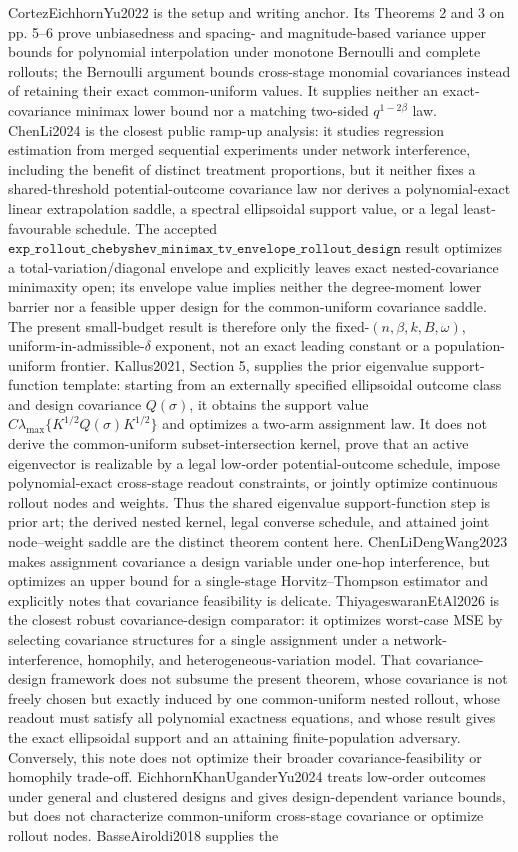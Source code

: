 \documentclass{article}
\begin{document}
CortezEichhornYu2022 is the setup and writing anchor. Its Theorems 2 and 3 on pp. 5--6 prove unbiasedness and spacing- and magnitude-based variance upper bounds for polynomial interpolation under monotone Bernoulli and complete rollouts; the Bernoulli argument bounds cross-stage monomial covariances instead of retaining their exact common-uniform values. It supplies neither an exact-covariance minimax lower bound nor a matching two-sided \(q^{1-2\beta}\) law. ChenLi2024 is the closest public ramp-up analysis: it studies regression estimation from merged sequential experiments under network interference, including the benefit of distinct treatment proportions, but it neither fixes a shared-threshold potential-outcome covariance law nor derives a polynomial-exact linear extrapolation saddle, a spectral ellipsoidal support value, or a legal least-favourable schedule. The accepted \(\texttt{exp\_rollout\_chebyshev\_minimax\_tv\_envelope\_rollout\_design}\) result optimizes a total-variation/diagonal envelope and explicitly leaves exact nested-covariance minimaxity open; its envelope value implies neither the degree-moment lower barrier nor a feasible upper design for the common-uniform covariance saddle. The present small-budget result is therefore only the fixed-\((n,\beta,k,B,\omega)\), uniform-in-admissible-\(\delta\) exponent, not an exact leading constant or a population-uniform frontier. Kallus2021, Section 5, supplies the prior eigenvalue support-function template: starting from an externally specified ellipsoidal outcome class and design covariance \(Q(\sigma)\), it obtains the support value \(C\lambda_{\max}\{K^{1/2}Q(\sigma)K^{1/2}\}\) and optimizes a two-arm assignment law. It does not derive the common-uniform subset-intersection kernel, prove that an active eigenvector is realizable by a legal low-order potential-outcome schedule, impose polynomial-exact cross-stage readout constraints, or jointly optimize continuous rollout nodes and weights. Thus the shared eigenvalue support-function step is prior art; the derived nested kernel, legal converse schedule, and attained joint node--weight saddle are the distinct theorem content here. ChenLiDengWang2023 makes assignment covariance a design variable under one-hop interference, but optimizes an upper bound for a single-stage Horvitz--Thompson estimator and explicitly notes that covariance feasibility is delicate. ThiyageswaranEtAl2026 is the closest robust covariance-design comparator: it optimizes worst-case MSE by selecting covariance structures for a single assignment under a network-interference, homophily, and heterogeneous-variation model. That covariance-design framework does not subsume the present theorem, whose covariance is not freely chosen but exactly induced by one common-uniform nested rollout, whose readout must satisfy all polynomial exactness equations, and whose result gives the exact ellipsoidal support and an attaining finite-population adversary. Conversely, this note does not optimize their broader covariance-feasibility or homophily trade-off. EichhornKhanUganderYu2024 treats low-order outcomes under general and clustered designs and gives design-dependent variance bounds, but does not characterize common-uniform cross-stage covariance or optimize rollout nodes. BasseAiroldi2018 supplies the 
\end{document}
